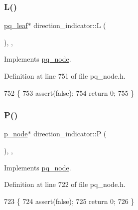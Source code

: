 \subsubsection{\texorpdfstring{L()}{L()}}
{\footnotesize\ttfamily \mbox{\hyperlink{classpq__leaf}{pq\+\_\+leaf}}$\ast$ direction\+\_\+indicator\+::L (\begin{DoxyParamCaption}{ }\end{DoxyParamCaption})\hspace{0.3cm}{\ttfamily [inline]}, {\ttfamily [private]}, {\ttfamily [virtual]}}



Implements \mbox{\hyperlink{classpq__node_a805b6ef48c847380b47c8ba882ed4ee2}{pq\+\_\+node}}.



Definition at line 751 of file pq\+\_\+node.\+h.


\begin{DoxyCode}
752     \{
753     assert(\textcolor{keyword}{false});
754     \textcolor{keywordflow}{return} 0;
755     \}
\end{DoxyCode}
\mbox{\label{classdirection__indicator_a505a48437200ab98e8165912fd1d40bf}} 
\subsubsection{\texorpdfstring{P()}{P()}}
{\footnotesize\ttfamily \mbox{\hyperlink{classp__node}{p\+\_\+node}}$\ast$ direction\+\_\+indicator\+::P (\begin{DoxyParamCaption}{ }\end{DoxyParamCaption})\hspace{0.3cm}{\ttfamily [inline]}, {\ttfamily [private]}, {\ttfamily [virtual]}}



Implements \mbox{\hyperlink{classpq__node_a72178a268ee1ece3ac106ac5fea3b12c}{pq\+\_\+node}}.



Definition at line 722 of file pq\+\_\+node.\+h.


\begin{DoxyCode}
723     \{
724     assert(\textcolor{keyword}{false});
725     \textcolor{keywordflow}{return} 0;
726     \}
\end{DoxyCode}
\mbox{\label{classpq__node_aa6830ab47a280f41fe61b7d2f8b508bb}} 
